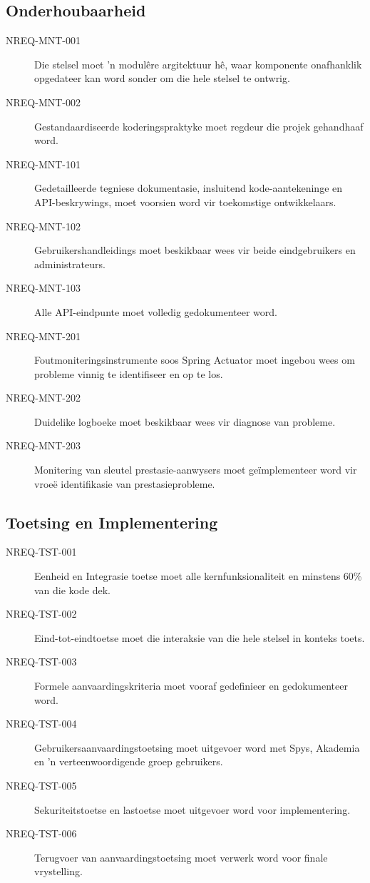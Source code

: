 \subsection{Onderhoubaarheid}
\begin{description}
  \item[NREQ-MNT-001] Die stelsel moet 'n modulêre argitektuur hê, waar komponente onafhanklik opgedateer kan word sonder om die hele stelsel te ontwrig.
  \item[NREQ-MNT-002] Gestandaardiseerde koderingspraktyke moet regdeur die projek gehandhaaf word.
  \item[NREQ-MNT-101] Gedetailleerde tegniese dokumentasie, insluitend kode-aantekeninge en API-beskrywings, moet voorsien word vir toekomstige ontwikkelaars.
  \item[NREQ-MNT-102] Gebruikershandleidings moet beskikbaar wees vir beide eindgebruikers en administrateurs.
  \item[NREQ-MNT-103] Alle API-eindpunte moet volledig gedokumenteer word.
  \item[NREQ-MNT-201] Foutmoniteringsinstrumente soos Spring Actuator moet ingebou wees om probleme vinnig te identifiseer en op te los.
  \item[NREQ-MNT-202] Duidelike logboeke moet beskikbaar wees vir diagnose van probleme.
  \item[NREQ-MNT-203] Monitering van sleutel prestasie-aanwysers moet geïmplementeer word vir vroeë identifikasie van prestasieprobleme.
\end{description}

\subsection{Toetsing en Implementering}
\begin{description}
  \item[NREQ-TST-001] Eenheid en Integrasie toetse moet alle kernfunksionaliteit en minstens 60\% van die kode dek.
  \item[NREQ-TST-002] Eind-tot-eindtoetse moet die interaksie van die hele stelsel in konteks toets.
  \item[NREQ-TST-003] Formele aanvaardingskriteria moet vooraf gedefinieer en gedokumenteer word.
  \item[NREQ-TST-004] Gebruikersaanvaardingstoetsing moet uitgevoer word met Spys, Akademia en 'n verteenwoordigende groep gebruikers.
  \item[NREQ-TST-005] Sekuriteitstoetse en lastoetse moet uitgevoer word voor implementering.
  \item[NREQ-TST-006] Terugvoer van aanvaardingstoetsing moet verwerk word voor finale vrystelling.
\end{description}